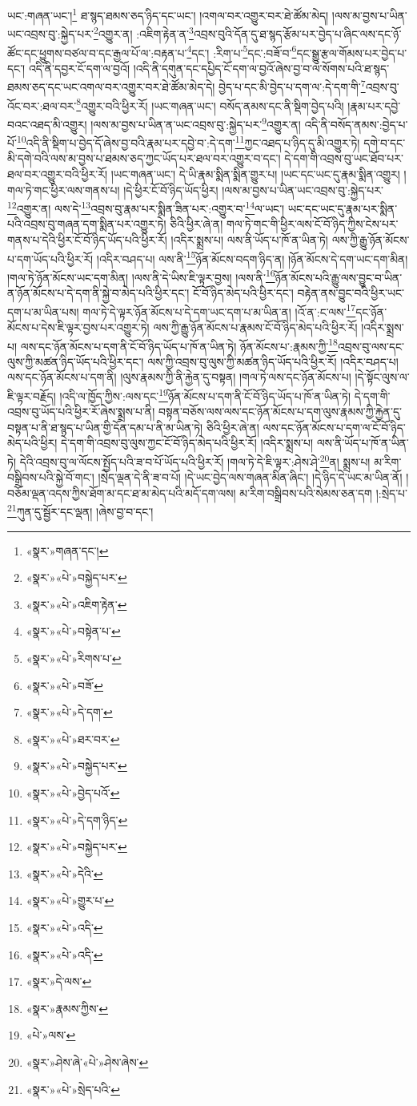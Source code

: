ཡང་:གཞན་ཡང་།\footnote{«སྣར་»གཞན་དང་།} ཐ་སྙད་ཐམས་ཅད་ཉིད་དང་ཡང་། །འགལ་བར་འགྱུར་བར་ཐེ་ཚོམ་མེད། །ལས་མ་བྱས་པ་ཡིན་ཡང་འབྲས་བུ་:སྐྱེད་པར་\footnote{«སྣར་»«པེ་»བསྐྱེད་པར་}འགྱུར་ན། :འཇིག་རྟེན་ན་\footnote{«སྣར་»«པེ་»འཇིག་རྟེན་}འབྲས་བུའི་དོན་དུ་ཐ་སྙད་རྩོམ་པར་བྱེད་པ་ཞིང་ལས་དང་ཉོ་ཚོང་དང་ཕྱུགས་བཙལ་བ་དང་རྒྱལ་པོ་ལ་:བརྟན་པ་\footnote{«སྣར་»«པེ་»བསྟེན་པ་}དང་། :རིག་པ་\footnote{«སྣར་»«པེ་»རིགས་པ་}དང་:བཟོ་བ་\footnote{«སྣར་»«པེ་»བཟོ་}དང་སྒྱུ་རྩལ་གོམས་པར་བྱེད་པ་དང་། འདི་ནི་དབྱར་ངོ་དག་ལ་བྱའོ། །འདི་ནི་དགུན་དང་དཔྱིད་ངོ་དག་ལ་བྱའོ་ཞེས་བྱ་བ་ལ་སོགས་པའི་ཐ་སྙད་ཐམས་ཅད་དང་ཡང་འགལ་བར་འགྱུར་བར་ཐེ་ཚོམ་མེད་དེ། བྱེད་པ་དང་མི་བྱེད་པ་དག་ལ་:དེ་དག་གི་\footnote{«སྣར་»«པེ་»དེ་དག་}འབྲས་བུ་འོང་བར་:ཐལ་བར་\footnote{«སྣར་»«པེ་»ཐར་བར་}འགྱུར་བའི་ཕྱིར་རོ། །ཡང་གཞན་ཡང་། བསོད་ནམས་དང་ནི་སྡིག་བྱེད་པའི། །རྣམ་པར་དབྱེ་བའང་འཐད་མི་འགྱུར། །ལས་མ་བྱས་པ་ཡིན་ན་ཡང་འབྲས་བུ་:སྐྱེད་པར་\footnote{«སྣར་»«པེ་»བསྐྱེད་པར་}འགྱུར་ན། འདི་ནི་བསོད་ནམས་:བྱེད་པ་པོ་\footnote{«སྣར་»«པེ་»བྱེད་པའོ་}འདི་ནི་སྡིག་པ་བྱེད་དོ་ཞེས་བྱ་བའི་རྣམ་པར་དབྱེ་བ་:དེ་དག་\footnote{«སྣར་»«པེ་»དེ་དག་ཉིད་}ཀྱང་འཐད་པ་ཉིད་དུ་མི་འགྱུར་ཏེ། དགེ་བ་དང་མི་དགེ་བའི་ལས་མ་བྱས་པ་ཐམས་ཅད་ཀྱང་ཡོད་པར་ཐལ་བར་འགྱུར་བ་དང་། དེ་དག་གི་འབྲས་བུ་ཡང་ཐོབ་པར་ཐལ་བར་འགྱུར་བའི་ཕྱིར་རོ། །ཡང་གཞན་ཡང་། དེ་ཡི་རྣམ་སྨིན་སྨིན་གྱུར་པ། །ཡང་དང་ཡང་དུ་རྣམ་སྨིན་འགྱུར། །གལ་ཏེ་གང་ཕྱིར་ལས་གནས་པ། །དེ་ཕྱིར་ངོ་བོ་ཉིད་ཡོད་ཕྱིར། །ལས་མ་བྱས་པ་ཡིན་ཡང་འབྲས་བུ་:སྐྱེད་པར་\footnote{«སྣར་»«པེ་»བསྐྱེད་པར་}འགྱུར་ན། ལས་དེ་\footnote{«སྣར་»«པེ་»དེའི་}འབྲས་བུ་རྣམ་པར་སྨིན་ཟིན་པར་:འགྱུར་བ་\footnote{«སྣར་»«པེ་»གྱུར་པ་}ལ་ཡང་། ཡང་དང་ཡང་དུ་རྣམ་པར་སྨིན་པའི་འབྲས་བུ་གཞན་དག་སྨིན་པར་འགྱུར་ཏེ། ཅིའི་ཕྱིར་ཞེ་ན། གལ་ཏེ་གང་གི་ཕྱིར་ལས་ངོ་བོ་ཉིད་ཀྱིས་ངེས་པར་གནས་པ་དེའི་ཕྱིར་ངོ་བོ་ཉིད་ཡོད་པའི་ཕྱིར་རོ། །འདིར་སྨྲས་པ། ལས་ནི་ཡོད་པ་ཁོ་ན་ཡིན་ཏེ། ལས་ཀྱི་རྒྱུ་ཉོན་མོངས་པ་དག་ཡོད་པའི་ཕྱིར་རོ། །འདིར་བཤད་པ། ལས་ནི་\footnote{«སྣར་»«པེ་»འདི་}ཉོན་མོངས་བདག་ཉིད་ན། །ཉོན་མོངས་དེ་དག་ཡང་དག་མིན། །གལ་ཏེ་ཉོན་མོངས་ཡང་དག་མིན། །ལས་ནི་དེ་ཡིས་ཇི་ལྟར་བྱས། །ལས་ནི་\footnote{«སྣར་»«པེ་»འདི་}ཉོན་མོངས་པའི་རྒྱུ་ལས་བྱུང་བ་ཡིན་ན་ཉོན་མོངས་པ་དེ་དག་ནི་སྐྱེ་བ་མེད་པའི་ཕྱིར་དང་། ངོ་བོ་ཉིད་མེད་པའི་ཕྱིར་དང་། བརྟེན་ནས་བྱུང་བའི་ཕྱིར་ཡང་དག་པ་མ་ཡིན་པས། གལ་ཏེ་དེ་ལྟར་ཉོན་མོངས་པ་དེ་དག་ཡང་དག་པ་མ་ཡིན་ན། །འོ་ན་:ང་ལས་\footnote{«སྣར་»དེ་ལས་}དང་ཉོན་མོངས་པ་དེས་ཇི་ལྟར་བྱས་པར་འགྱུར་ཏེ། ལས་ཀྱི་རྒྱུ་ཉོན་མོངས་པ་རྣམས་ངོ་བོ་ཉིད་མེད་པའི་ཕྱིར་རོ། །འདིར་སྨྲས་པ། ལས་དང་ཉོན་མོངས་པ་དག་ནི་ངོ་བོ་ཉིད་ཡོད་པ་ཁོ་ན་ཡིན་ཏེ། ཉོན་མོངས་པ་:རྣམས་ཀྱི་\footnote{«སྣར་»རྣམས་ཀྱིས་}འབྲས་བུ་ལས་དང་ལུས་ཀྱི་མཚན་ཉིད་ཡོད་པའི་ཕྱིར་དང་། ལས་ཀྱི་འབྲས་བུ་ལུས་ཀྱི་མཚན་ཉིད་ཡོད་པའི་ཕྱིར་རོ། །འདིར་བཤད་པ། ལས་དང་ཉོན་མོངས་པ་དག་ནི། །ལུས་རྣམས་ཀྱི་ནི་རྐྱེན་དུ་བསྟན། །གལ་ཏེ་ལས་དང་ཉོན་མོངས་པ། །དེ་སྟོང་ལུས་ལ་ཇི་ལྟར་བརྗོད། །འདི་ལ་ཁྱོད་ཀྱིས་:ལས་དང་\footnote{«པེ་»ལས་}ཉོན་མོངས་པ་དག་ནི་ངོ་བོ་ཉིད་ཡོད་པ་ཁོ་ན་ཡིན་ཏེ། དེ་དག་གི་འབྲས་བུ་ཡོད་པའི་ཕྱིར་རོ་ཞེས་སྨྲས་པ་ནི། བསྟན་བཅོས་ལས་ལས་དང་ཉོན་མོངས་པ་དག་ལུས་རྣམས་ཀྱི་རྐྱེན་དུ་བསྟན་པ་ནི་ཐ་སྙད་པ་ཡིན་གྱི་དོན་དམ་པ་ནི་མ་ཡིན་ཏེ། ཅིའི་ཕྱིར་ཞེ་ན། ལས་དང་ཉོན་མོངས་པ་དག་ལ་ངོ་བོ་ཉིད་མེད་པའི་ཕྱིར། དེ་དག་གི་འབྲས་བུ་ལུས་ཀྱང་ངོ་བོ་ཉིད་མེད་པའི་ཕྱིར་རོ། །འདིར་སྨྲས་པ། ལས་ནི་ཡོད་པ་ཁོ་ན་ཡིན་ཏེ། དེའི་འབྲས་བུ་ལ་ལོངས་སྤྱོད་པའི་ཟ་བ་པོ་ཡོད་པའི་ཕྱིར་རོ། །གལ་ཏེ་དེ་ཇི་ལྟར་:ཤེས་ཤེ་\footnote{«སྣར་»ཤེས་ཞེ་«པེ་»ཤེས་ཞེས་}ན། སྨྲས་པ། མ་རིག་བསྒྲིབས་པའི་སྐྱེ་བོ་གང་། །སྲེད་ལྡན་དེ་ནི་ཟ་བ་པོ། །དེ་ཡང་བྱེད་ལས་གཞན་མིན་ཞིང་། །དེ་ཉིད་དེ་ཡང་མ་ཡིན་ནོ། །བཅོམ་ལྡན་འདས་ཀྱིས་ཐོག་མ་དང་ཐ་མ་མེད་པའི་མདོ་དག་ལས། མ་རིག་བསྒྲིབས་པའི་སེམས་ཅན་དག །:སྲེད་པ་\footnote{«སྣར་»«པེ་»སྲེད་པའི་}ཀུན་དུ་སྦྱོར་དང་ལྡན། །ཞེས་བྱ་བ་དང་། 